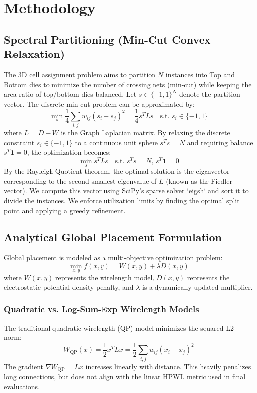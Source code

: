 \documentclass[10pt, twocolumn]{article}
\begin{document}
\section{Methodology}

\subsection{Spectral Partitioning (Min-Cut Convex Relaxation)}
The 3D cell assignment problem aims to partition $N$ instances into Top and Bottom dies to minimize the number of crossing nets (min-cut) while keeping the area ratio of top/bottom dies balanced. Let $s \in \{-1, 1\}^N$ denote the partition vector. The discrete min-cut problem can be approximated by:
\begin{equation}
\min_{s} \frac{1}{4} \sum_{i,j} w_{ij}(s_i - s_j)^2 = \frac{1}{4} s^T L s \quad \text{s.t. } s_i \in \{-1,1\}
\end{equation}
where $L = D - W$ is the Graph Laplacian matrix. By relaxing the discrete constraint $s_i \in \{-1,1\}$ to a continuous unit sphere $s^T s = N$ and requiring balance $s^T \mathbf{1} = 0$, the optimization becomes:
\begin{equation}
\min_{s} s^T L s \quad \text{s.t. } s^T s = N, \ s^T \mathbf{1} = 0
\end{equation}
By the Rayleigh Quotient theorem, the optimal solution is the eigenvector corresponding to the second smallest eigenvalue of $L$ (known as the Fiedler vector). We compute this vector using SciPy's sparse solver `eigsh` and sort it to divide the instances. We enforce utilization limits by finding the optimal split point and applying a greedy refinement.

\subsection{Analytical Global Placement Formulation}
Global placement is modeled as a multi-objective optimization problem:
\begin{equation}
\min_{x, y} f(x, y) = W(x, y) + \lambda D(x, y)
\end{equation}
where $W(x, y)$ represents the wirelength model, $D(x, y)$ represents the electrostatic potential density penalty, and $\lambda$ is a dynamically updated multiplier.

\subsubsection{Quadratic vs. Log-Sum-Exp Wirelength Models}
The traditional quadratic wirelength (QP) model minimizes the squared L2 norm:
\begin{equation}
W_{\text{QP}}(x) = \frac{1}{2} x^T L x = \frac{1}{2} \sum_{i,j} w_{ij} (x_i - x_j)^2
\end{equation}
The gradient $\nabla W_{\text{QP}} = L x$ increases linearly with distance. This heavily penalizes long connections, but does not align with the linear HPWL metric used in final evaluations. 
\end{document}
